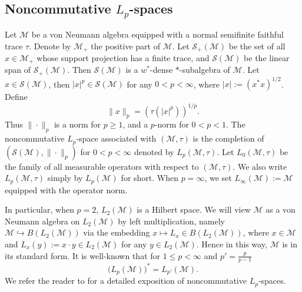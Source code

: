 \documentclass[oneside,english,a4wide]{amsart}
\numberwithin{equation}{section}
\numberwithin{figure}{section}
\theoremstyle{plain}
\theoremstyle{plain}
\theoremstyle{definition}
\theoremstyle{plain}
\theoremstyle{remark}
\theoremstyle{definition}
\theoremstyle{remark}
\theoremstyle{definition}
\newcommand{\M}{{\mathcal M}}
\newcommand{\8}{\infty}
\begin{document}
\subsection{Noncommutative $L_p$-spaces} Let $\mathcal{M}$ be a von Neumann algebra equipped with a normal semifinite faithful trace $\tau$. Denote by $\M_+$ the positive part of $\M$. Let $\mathcal{S}_+(\M)$ be the set of all $x\in \M_+$ whose support projection has a finite trace, and $\mathcal{S}(\mathcal{M})$ be the linear span of $\mathcal{S}_+(\mathcal{M})$. Then $\mathcal{S}(\mathcal{M})$ is a $w^*$-dense $*$-subalgebra of $\mathcal{M}$. Let $x\in\mathcal{S}(\mathcal{M})$, then $|x|^p\in\mathcal{S}(\mathcal{M})$ for any $0<p<\infty$, where $|x|:=(x^*x)^{1/2}$. Define
\[\|x\|_p=(\tau(|x|^p))^{1/p}.\]
Thus $\|\cdot\|_p$ is a norm for $p\ge 1$, and a $p$-norm for $0<p<1$. The noncommutative $L_p$-space associated with $(\mathcal{M},\tau)$ is the completion of $(\mathcal{S}(\M),\|\cdot\|_p)$ for $0<p<\8$  denoted by $L_p(\mathcal{M},\tau)$. Let $L_0(\M, \tau)$ be the family of all measurable operators with respect to $(\M, \tau)$. We also write $L_p(\mathcal{M},\tau)$ simply by $L_p(\mathcal{M})$ for short. When $p=\8$, we set $L_\infty(\mathcal{M}):=\mathcal{M}$ equipped with the operator norm. 

In particular, when $p=2$, $L_2(\M)$ is a Hilbert space. We will view $\mathcal{M}$ as a von Neumann algebra on $L_2(\mathcal{M})$ by left multiplication, namely  $\M \hookrightarrow B(L_2(\M))$ via the embedding $x\mapsto L_x\in B(L_2(\M))$, where $x\in \M$ and $L_x(y):= x\cdot y\in L_2(\M)$ for any $y\in L_2(\M)$. Hence in this way, $\mathcal{M}$ is in its standard form. It is well-known that for $1\leq p<\8$ and $p'=\frac{p}{p-1}$
$$  \big(L_p(\M)\big)^*=L_{p'}(\M).  $$
We refer the reader to \cite{PX} for a detailed exposition of noncommutative $L_p$-spaces.
\end{document}
